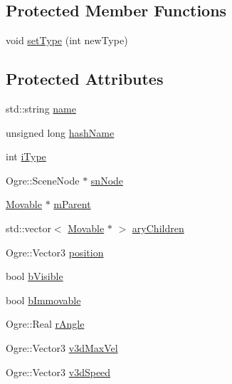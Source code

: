 \subsection*{Protected Member Functions}
\begin{DoxyCompactItemize}
\item 
void \hyperlink{class_rad_xml_1_1_movable_a0fc376b64aacdc97140b1e9d1ff4345f}{set\-Type} (int new\-Type)
\end{DoxyCompactItemize}
\subsection*{Protected Attributes}
\begin{DoxyCompactItemize}
\item 
std\-::string \hyperlink{class_rad_xml_1_1_movable_aaea33a220c19157231ac3fae2b0c5134}{name}
\item 
unsigned long \hyperlink{class_rad_xml_1_1_movable_afb9f3fb58df7f80ca1ed3a17e776e84b}{hash\-Name}
\item 
int \hyperlink{class_rad_xml_1_1_movable_a4a71bc0ac95b2e359c73e8d6b96d1c6e}{i\-Type}
\item 
Ogre\-::\-Scene\-Node $\ast$ \hyperlink{class_rad_xml_1_1_movable_a459ee5de83b72757d2081cac98f25bb2}{sn\-Node}
\item 
\hyperlink{class_rad_xml_1_1_movable}{Movable} $\ast$ \hyperlink{class_rad_xml_1_1_movable_a65a2f76dbee86d45e73e73843b1c54be}{m\-Parent}
\item 
std\-::vector$<$ \hyperlink{class_rad_xml_1_1_movable}{Movable} $\ast$ $>$ \hyperlink{class_rad_xml_1_1_movable_ade16ade0ce2baf111d16c42769dfacfe}{ary\-Children}
\item 
Ogre\-::\-Vector3 \hyperlink{class_rad_xml_1_1_movable_a0557c828c38faf3447a6910c038e7673}{position}
\item 
bool \hyperlink{class_rad_xml_1_1_movable_a7b881ba1af3ee32fdea11e61de73a1ca}{b\-Visible}
\item 
bool \hyperlink{class_rad_xml_1_1_movable_abe3d4c7ad61050d4d6a70214b81fff80}{b\-Immovable}
\item 
Ogre\-::\-Real \hyperlink{class_rad_xml_1_1_movable_a22912427f0f1858679577c419f93aef7}{r\-Angle}
\item 
Ogre\-::\-Vector3 \hyperlink{class_rad_xml_1_1_movable_a422ba28989b1a0399b4067b2eebe8432}{v3d\-Max\-Vel}
\item 
Ogre\-::\-Vector3 \hyperlink{class_rad_xml_1_1_movable_a705a1bdbe95de19350ebf6771c70c3b2}{v3d\-Speed}
\item 

\end{DoxyCompactItemize}
